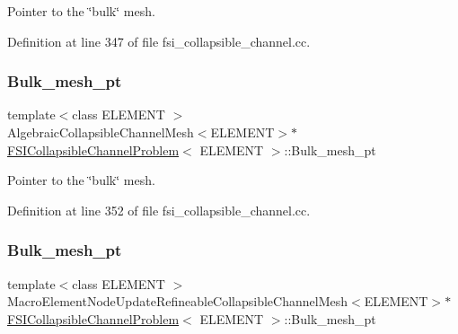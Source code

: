 Pointer to the \char`\"{}bulk\char`\"{} mesh. 



Definition at line 347 of file fsi\+\_\+collapsible\+\_\+channel.\+cc.

\mbox{\label{classFSICollapsibleChannelProblem_a74c09286f4ad4242c37b6ea16c069fae}} 
\subsubsection{\texorpdfstring{Bulk\+\_\+mesh\+\_\+pt}{Bulk\_mesh\_pt}\hspace{0.1cm}{\footnotesize\ttfamily [2/6]}}
{\footnotesize\ttfamily template$<$class E\+L\+E\+M\+E\+NT $>$ \\
Algebraic\+Collapsible\+Channel\+Mesh$<$E\+L\+E\+M\+E\+NT$>$$\ast$ \hyperlink{classFSICollapsibleChannelProblem}{F\+S\+I\+Collapsible\+Channel\+Problem}$<$ E\+L\+E\+M\+E\+NT $>$\+::Bulk\+\_\+mesh\+\_\+pt\hspace{0.3cm}{\ttfamily [private]}}



Pointer to the \char`\"{}bulk\char`\"{} mesh. 



Definition at line 352 of file fsi\+\_\+collapsible\+\_\+channel.\+cc.

\mbox{\label{classFSICollapsibleChannelProblem_a211bcc5fb6076133f46d63bfd827dd3f}} 
\subsubsection{\texorpdfstring{Bulk\+\_\+mesh\+\_\+pt}{Bulk\_mesh\_pt}\hspace{0.1cm}{\footnotesize\ttfamily [3/6]}}
{\footnotesize\ttfamily template$<$class E\+L\+E\+M\+E\+NT $>$ \\
Macro\+Element\+Node\+Update\+Refineable\+Collapsible\+Channel\+Mesh$<$E\+L\+E\+M\+E\+NT$>$$\ast$ \hyperlink{classFSICollapsibleChannelProblem}{F\+S\+I\+Collapsible\+Channel\+Problem}$<$ E\+L\+E\+M\+E\+NT $>$\+::Bulk\+\_\+mesh\+\_\+pt\hspace{0.3cm}{\ttfamily [private]}}



